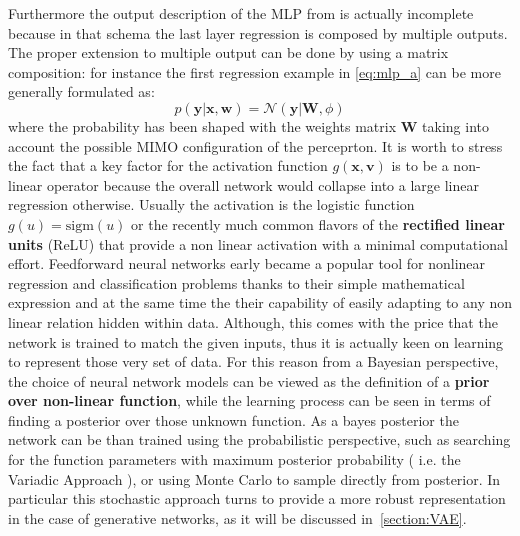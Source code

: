 Furthermore the output description of the \acs{MLP} from \Figure{\ref{fig:generic_mlp_a}} is actually incomplete because in that schema the last layer regression is composed by multiple outputs. 
The proper extension to multiple output can be done by using a matrix composition: for instance the first regression example in \eqref{eq:mlp_a} can be more generally formulated as:
\begin{equation}
    p(\bm{y}|\bm{x}, \bm{w}) = \mathcal{N}\left( \bm{y}|\bm{W},\phi \right)
\end{equation}
where the probability has been shaped with the weights matrix $\bm{W}$ taking into account the possible MIMO configuration of the perceprton.
It is worth to stress the fact that a key factor for the activation function $g(\bm{x},\bm{v})$ is to be a non-linear operator because the overall network would collapse into a large linear regression otherwise. Usually the activation is the logistic function $g(u) = \text{sigm}(u)$ or the recently much common flavors of the \textbf{rectified linear units} (ReLU) that provide a non linear activation with a minimal computational effort.
%
% 
%
Feedforward neural networks early became a popular tool for nonlinear regression and classification problems thanks to their simple mathematical expression and at the same time the their capability of easily adapting to any non linear relation hidden within data. Although, this comes with the price that the network is trained to match the given inputs, thus it is actually keen on learning to represent those very set of data.
%
For this reason from a Bayesian perspective, the choice of neural network models can be viewed as the definition of a \textbf{prior over non-linear function}, while the learning process can be seen in terms of finding a posterior over those unknown function. 
As a bayes posterior the network can be than trained using the probabilistic perspective, such as searching for the function parameters with maximum posterior probability ( i.e. the Variadic Approach ), or using Monte Carlo to sample directly from posterior. In particular this stochastic approach turns to provide a more robust representation in the case of generative networks, as it will be discussed in~\cref{section:VAE}.
%


